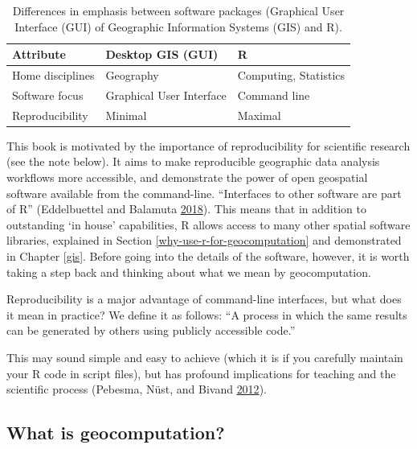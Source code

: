 \documentclass[]{krantz}
\let\BeginKnitrBlock\begin \let\EndKnitrBlock\end
\begin{document}
\begin{table}[t]

\caption[Differences between GUI and CLI]{\label{tab:gdsl}Differences in emphasis between software packages (Graphical User Interface (GUI) of Geographic Information Systems (GIS) and R).}
\centering
\begin{tabular}{lll}
\toprule
Attribute & Desktop GIS (GUI) & R\\
\midrule
Home disciplines & Geography & Computing, Statistics\\
Software focus & Graphical User Interface & Command line\\
Reproducibility & Minimal & Maximal\\
\bottomrule
\end{tabular}
\end{table}

This book is motivated by the importance of reproducibility for scientific research (see the note below).
It aims to make reproducible geographic data analysis workflows more accessible, and demonstrate the power of open geospatial software available from the command-line.
``Interfaces to other software are part of R'' (Eddelbuettel and Balamuta \protect\hyperlink{ref-eddelbuettel_extending_2018}{2018}).
This means that in addition to outstanding `in house' capabilities, R allows access to many other spatial software libraries, explained in Section \ref{why-use-r-for-geocomputation} and demonstrated in Chapter \ref{gis}.
Before going into the details of the software, however, it is worth taking a step back and thinking about what we mean by geocomputation.

\BeginKnitrBlock{rmdnote}
Reproducibility is a major advantage of command-line interfaces, but what does it mean in practice?
We define it as follows: ``A process in which the same results can be generated by others using publicly accessible code.''

This may sound simple and easy to achieve (which it is if you carefully maintain your R code in script files), but has profound implications for teaching and the scientific process (Pebesma, Nüst, and Bivand \protect\hyperlink{ref-pebesma_r_2012}{2012}).
\EndKnitrBlock{rmdnote}

\hypertarget{what-is-geocomputation}{%
\subsection{What is geocomputation?}\label{what-is-geocomputation}}
\end{document}

